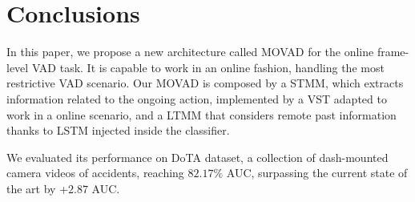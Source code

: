 \section{Conclusions}
\label{sec:conclusions}

In this paper, we propose a new architecture called MOVAD for the online frame-level VAD task.
It is capable to work in an online fashion, handling the most restrictive VAD scenario. 
Our MOVAD is composed by a STMM, which extracts information related to the ongoing action, implemented by a VST adapted to work in a online scenario, and a LTMM that considers remote past information thanks to LSTM injected inside the classifier.

We evaluated its performance on DoTA dataset, a collection of dash-mounted camera videos of accidents, reaching $82.17\%$ AUC, surpassing the current state of the art by +$2.87$ AUC.